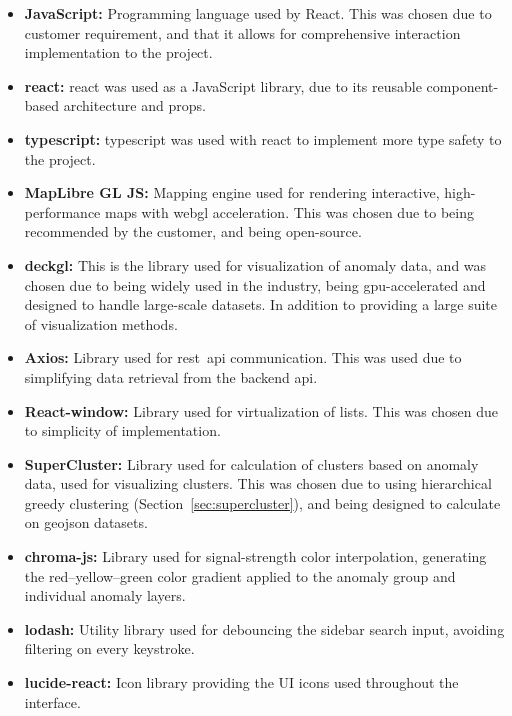 \begin{itemize}
\item \textbf{JavaScript:} Programming language used by React. This was chosen due to customer requirement, and that it allows for comprehensive interaction implementation to the project. 
\item \textbf{\gls{react}:} \gls{react} was used as a JavaScript library, due to its reusable component-based architecture and props.
\item \textbf{\gls{typescript}:} \gls{typescript} was used with \gls{react} to implement more type safety to the project.
\item \textbf{MapLibre GL JS:} Mapping engine used for rendering interactive, high-performance maps with \acrshort{webgl} acceleration. This was chosen due to being recommended by the customer, and being open-source. 
\item \textbf{\gls{deckgl}:} This is the library used for visualization of anomaly data, and was chosen due to being widely used in the industry, being \acrshort{gpu}-accelerated and designed to handle large-scale datasets. In addition to providing a large suite of visualization methods.
\item \textbf{Axios:} Library used for \acrshort{rest}~\acrshort{api} communication. This was used due to simplifying data retrieval from the backend \acrshort{api}.
\item \textbf{React-window:} Library used for virtualization of lists. This was chosen due to simplicity of implementation.
\item \textbf{SuperCluster:} Library used for calculation of clusters based on anomaly data, used for visualizing clusters. This was chosen due to using hierarchical greedy clustering (Section~\ref{sec:supercluster}), and being designed to calculate on \acrshort{geojson} datasets.
\item \textbf{chroma-js:} Library used for signal-strength color interpolation, generating the red–yellow–green color gradient applied to the anomaly group and individual anomaly layers.
\item \textbf{lodash:} Utility library used for debouncing the sidebar search input, avoiding filtering on every keystroke.
\item \textbf{lucide-react:} Icon library providing the UI icons used throughout the interface.

\end{itemize}

